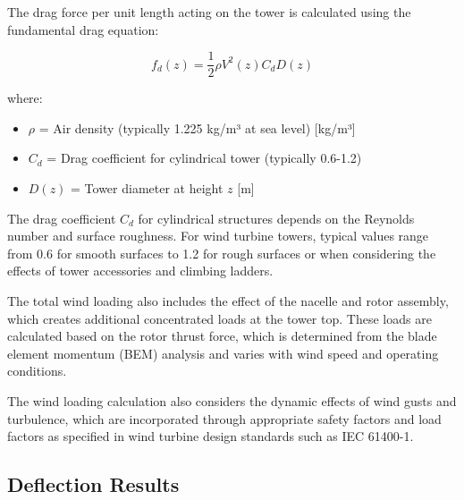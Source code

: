 \documentclass[12pt]{article}
\begin{document}
The drag force per unit length acting on the tower is calculated using the fundamental drag equation:

\begin{equation}
f_d(z) = \frac{1}{2}\rho V^2(z) C_d D(z)
\end{equation}

where:
\begin{itemize}
    \item $\rho$ = Air density (typically 1.225 kg/m³ at sea level) [kg/m³]
    \item $C_d$ = Drag coefficient for cylindrical tower (typically 0.6-1.2)
    \item $D(z)$ = Tower diameter at height $z$ [m]
\end{itemize}

The drag coefficient $C_d$ for cylindrical structures depends on the Reynolds number and surface roughness. For wind turbine towers, typical values range from 0.6 for smooth surfaces to 1.2 for rough surfaces or when considering the effects of tower accessories and climbing ladders.

The total wind loading also includes the effect of the nacelle and rotor assembly, which creates additional concentrated loads at the tower top. These loads are calculated based on the rotor thrust force, which is determined from the blade element momentum (BEM) analysis and varies with wind speed and operating conditions.

The wind loading calculation also considers the dynamic effects of wind gusts and turbulence, which are incorporated through appropriate safety factors and load factors as specified in wind turbine design standards such as IEC 61400-1.

\subsection{Deflection Results}
\end{document}

